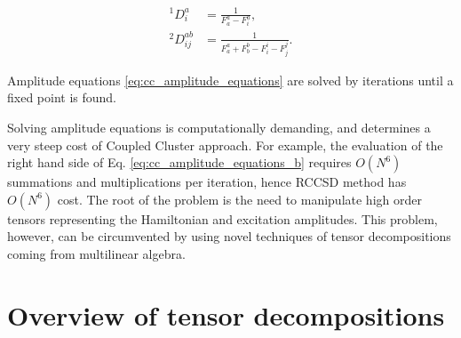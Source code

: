 \begin{subequations}
\begin{align} {}^1D_i^a &= \frac{1}{F_a^a - F_i^a}, \\
{}^{2}D_{ij}^{ab} &= \frac{1}{F_{a}^{a} + F_{b}^{b} - F_{i}^{i} -
F_{j}^{j}}.
\end{align}
\label{eq:denom_definition}
\end{subequations} 

Amplitude equations \ref{eq:cc_amplitude_equations} are solved by iterations 
until a fixed point is found. 

Solving amplitude equations is computationally demanding, and determines a 
very steep cost of Coupled Cluster approach. For example, the evaluation of 
the right hand side of Eq. \ref{eq:cc_amplitude_equations_b} requires 
$O(N^6)$ summations and multiplications per iteration, hence RCCSD method has 
$O(N^6)$ cost. The root of the problem is the need to manipulate high order 
tensors representing the Hamiltonian and excitation amplitudes. This problem, 
however, can be circumvented by using novel techniques of tensor 
decompositions coming from multilinear algebra.\cite{kolda2009tensor} 

\section{Overview of tensor decompositions}

